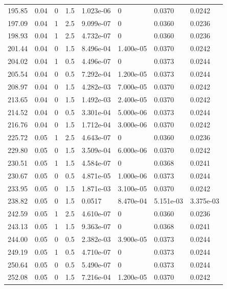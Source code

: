 \documentclass[preview]{standalone}
\begin{document}
{{{\begin{tabular}{L{1.2cm}C{1.2cm} C{0.3cm}C{0.5cm} C{1.4cm}C{1.4cm} C{1.4cm}C{1.4cm}}
  195.85  &  0.04  & 0     & 1.5 &  1.023e-06  & 0  & 0.0370 &  0.0242   \\ 
  197.09  &  0.04  & 1     & 2.5 &  9.099e-07  & 0  & 0.0360 &  0.0236   \\ 
  198.93  &  0.04  & 1     & 2.5 &  4.732e-07  & 0  & 0.0360 &  0.0236   \\ 
  201.44  &  0.04  & 0     & 1.5 &  8.496e-04  & 1.400e-05  & 0.0370 &  0.0242   \\ 
  204.02  &  0.04  & 1     & 0.5 &  4.496e-07  & 0  & 0.0373 &  0.0244   \\ 
  205.54  &  0.04  & 0     & 0.5 &  7.292e-04  & 1.200e-05  & 0.0373 &  0.0244   \\ 
  208.97  &  0.04  & 0     & 1.5 &  4.282e-03  & 7.000e-05  & 0.0370 &  0.0242   \\ 
  213.65  &  0.04  & 0     & 1.5 &  1.492e-03  & 2.400e-05  & 0.0370 &  0.0242   \\ 
  214.52  &  0.04  & 0     & 0.5 &  3.301e-04  & 5.000e-06  & 0.0373 &  0.0244   \\ 
  216.76  &  0.04  & 0     & 1.5 &  1.712e-04  & 3.000e-06  & 0.0370 &  0.0242   \\ 
  225.72  &  0.05  & 1     & 2.5 &  4.643e-07  & 0  & 0.0360 &  0.0236   \\ 
  229.80  &  0.05  & 0     & 1.5 &  3.509e-04  & 6.000e-06  & 0.0370 &  0.0242   \\ 
  230.51  &  0.05  & 1     & 1.5 &  4.584e-07  & 0  & 0.0368 &  0.0241   \\ 
  230.67  &  0.05  & 0     & 0.5 &  4.871e-05  & 1.000e-06  & 0.0373 &  0.0244   \\ 
  233.95  &  0.05  & 0     & 1.5 &  1.871e-03  & 3.100e-05  & 0.0370 &  0.0242   \\ 
  238.82  &  0.05  & 0     & 1.5 &  0.0517  & 8.470e-04  & 5.151e-03 &  3.375e-03   \\ 
  242.59  &  0.05  & 1     & 2.5 &  4.610e-07  & 0  & 0.0360 &  0.0236   \\ 
  243.13  &  0.05  & 1     & 1.5 &  9.363e-07  & 0  & 0.0368 &  0.0241   \\ 
  244.00  &  0.05  & 0     & 0.5 &  2.382e-03  & 3.900e-05  & 0.0373 &  0.0244   \\ 
  249.19  &  0.05  & 1     & 0.5 &  4.710e-07  & 0  & 0.0373 &  0.0244   \\ 
  250.64  &  0.05  & 0     & 0.5 &  5.490e-07  & 0  & 0.0373 &  0.0244   \\ 
  252.08  &  0.05  & 0     & 1.5 &  7.216e-04  & 1.200e-05  & 0.0370 &  0.0242   \\ 

\end{tabular}}}}
\end{document}
